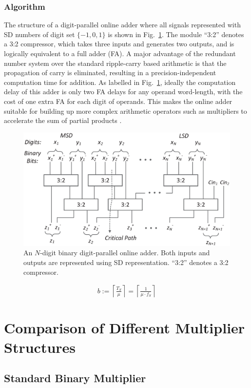 \documentclass[10pt, conference, compsocconf]{IEEEtran}
\begin{document}
\subsubsection{Algorithm}
The structure of a digit-parallel online adder where all signals represented with SD numbers of digit set $\{-1,0,1\}$ is shown in Fig.~\ref{Fig:Radix2SD_adder}. The module ``3:2'' denotes a 3:2 compressor, which takes three inputs and generates two outputs, and is logically equivalent to a full adder (FA). A major advantage of the redundant number system over the standard ripple-carry based arithmetic is that the propagation of carry is eliminated, resulting in a precision-independent computation time for addition. As labelled in Fig.~\ref{Fig:Radix2SD_adder}, ideally the computation delay of this adder is only two FA delays for any operand word-length, with the cost of one extra FA for each digit of operands. This makes the online adder suitable for building up more complex arithmetic operators such as multipliers to accelerate the sum of partial products \cite{RedundantMult_1987}.
%
\begin{figure}[tbp]
  \centering
  \includegraphics[width=.45\textwidth]{./figures/SDAdder.eps}
  \caption{An $N$-digit binary digit-parallel online adder. Both inputs and outputs are represented using SD representation. ``3:2'' denotes a 3:2 compressor.}
    \vspace{-2ex}
  \label{Fig:Radix2SD_adder}
\end{figure}

\begin{eqnarray}\label{Eq:b}
    b:=\left\lceil \frac{T_S}{\mu} \right\rceil=\left\lceil \frac{1}{\mu\cdot f_S}\right\rceil
\end{eqnarray}



\section{Comparison of Different Multiplier Structures}
\subsection{Standard Binary Multiplier}
\end{document}
